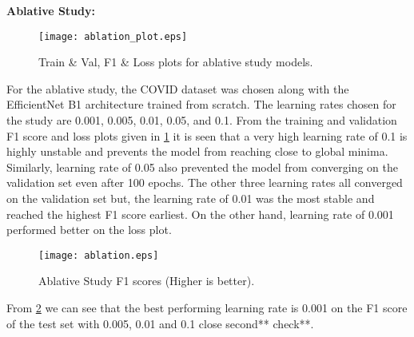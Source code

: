 \documentclass[10pt,twocolumn,letterpaper]{article}
\begin{document}
\textbf{Ablative Study:}
\begin{figure}[t]
  \centering
  \texttt{[image: ablation\_plot.eps]}  
   \caption{Train \& Val, F1 \& Loss plots for ablative study models.}
   \label{fig:ablation_plot}
\end{figure}
For the ablative study, the COVID dataset was chosen along with the EfficientNet B1 architecture 
trained from scratch. The learning rates chosen for the study are 0.001, 0.005, 0.01, 0.05, and 0.1.
From the training and validation F1 score and loss plots given in 
\cref{fig:ablation_plot} it is seen that a very high learning rate of 0.1 is highly unstable and 
prevents the model from reaching close to global minima. Similarly, learning rate of 0.05 also prevented 
the model from converging on the validation set even after 100 epochs. The other three learning 
rates all converged on the validation set but, the learning rate of 0.01 was the most stable 
and reached the highest F1 score earliest. On the other hand, learning rate of 0.001 performed better 
on the loss plot.
\begin{figure}[t]
  \centering
  \texttt{[image: ablation.eps]}  
   \caption{Ablative Study F1 scores (Higher is better).}
   \label{fig:ablation}
\end{figure}
From \cref{fig:ablation} we can see that the best performing learning rate is 0.001 
on the F1 score of the test set with 0.005, 0.01 and 0.1 close second** check**. 






\clearpage
{\small


}
\end{document}
